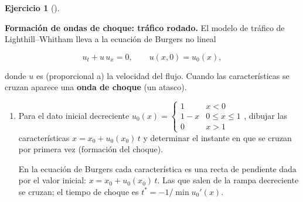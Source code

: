 \documentclass[
  spanish,
  a4paper,
]{scrreport}
\theoremstyle{definition}
\newtheorem{exercise}{Ejercicio}[chapter]
\theoremstyle{remark}
\begin{document}
\begin{exercise}[]\protect\hypertarget{exr-burgers-choque}{}\label{exr-burgers-choque}

\textbf{Formación de ondas de choque: tráfico rodado.} El modelo de
tráfico de Lighthill--Whitham lleva a la ecuación de Burgers no lineal

\[
u_t + u\,u_x = 0, \qquad u(x, 0) = u_0(x),
\]

donde \(u\) es (proporcional a) la velocidad del flujo. Cuando las
características se cruzan aparece una \textbf{onda de choque} (un
atasco).

\begin{enumerate}
\def\labelenumi{\alph{enumi}.}
\item
  Para el dato inicial decreciente
  \(u_0(x) = \begin{cases} 1 & x < 0 \\ 1 - x & 0 \le x \le 1 \\ 0 & x > 1\end{cases}\),
  dibujar las características \(x = x_0 + u_0(x_0)\,t\) y determinar el
  instante en que se cruzan por primera vez (formación del choque).

  \begin{tcolorbox}[enhanced jigsaw, arc=.35mm, bottomrule=.15mm, bottomtitle=1mm, breakable, colback=white, colbacktitle=quarto-callout-note-color!10!white, colframe=quarto-callout-note-color-frame, coltitle=black, left=2mm, leftrule=.75mm, opacityback=0, opacitybacktitle=0.6, rightrule=.15mm, title=\textcolor{quarto-callout-note-color}{\faInfo}\hspace{0.5em}{Ayuda}, titlerule=0mm, toprule=.15mm, toptitle=1mm]

  En la ecuación de Burgers cada característica es una recta de
  pendiente dada por el valor inicial: \(x = x_0 + u_0(x_0)\,t\). Las
  que salen de la rampa decreciente se cruzan; el tiempo de choque es
  \(t^* = -1/\min u_0'(x)\).

  \end{tcolorbox}

  \begin{tcolorbox}[enhanced jigsaw, arc=.35mm, bottomrule=.15mm, bottomtitle=1mm, breakable, colback=white, colbacktitle=quarto-callout-tip-color!10!white, colframe=quarto-callout-tip-color-frame, coltitle=black, left=2mm, leftrule=.75mm, opacityback=0, opacitybacktitle=0.6, rightrule=.15mm, title=\textcolor{quarto-callout-tip-color}{\faLightbulb}\hspace{0.5em}{Solución}, titlerule=0mm, toprule=.15mm, toptitle=1mm]


\end{tcolorbox}
\end{enumerate}
\end{exercise}
\end{document}
